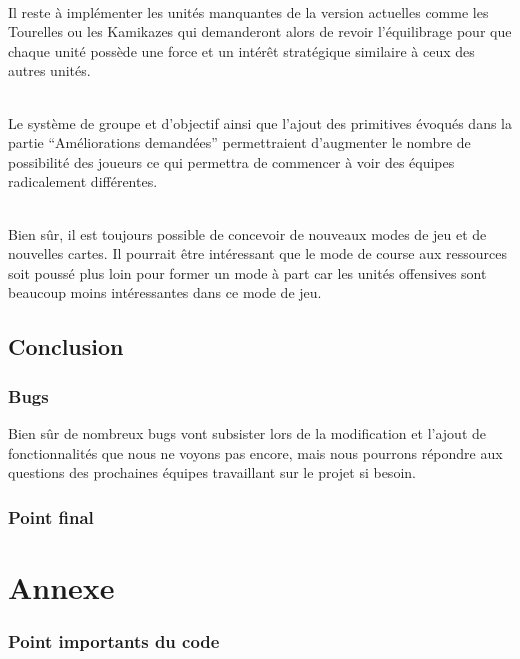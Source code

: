 \documentclass{report}
\begin{document}
\paragraph{}
Il reste à implémenter les unités manquantes de la version actuelles comme les Tourelles ou les Kamikazes qui demanderont alors de revoir l’équilibrage pour que chaque unité possède une force et un intérêt stratégique similaire à ceux des autres unités.
\paragraph{}
 Le système de groupe et d’objectif ainsi que l’ajout des primitives évoqués dans la partie “Améliorations demandées” permettraient d’augmenter le nombre de possibilité des joueurs ce qui permettra de commencer à voir des équipes radicalement différentes.
\paragraph{}
Bien sûr, il est toujours possible de concevoir de nouveaux modes de jeu et de nouvelles cartes. Il pourrait être intéressant que le mode de course aux ressources soit poussé plus loin pour former un mode à part car les unités offensives sont beaucoup moins intéressantes dans ce mode de jeu.


\chapter{Conclusion}
\section{Bugs}
Bien sûr de nombreux bugs vont subsister lors de la modification et l’ajout de fonctionnalités que nous ne voyons pas encore, mais nous pourrons répondre aux questions des prochaines équipes travaillant sur le projet si besoin.

\section{Point final}
\part{Annexe}
\section{Point importants du code}
\end{document}
